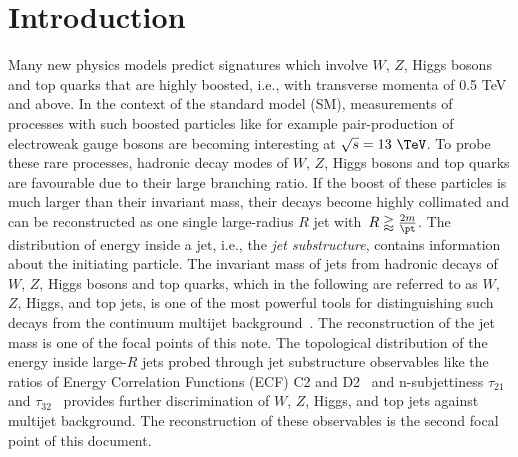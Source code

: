 \documentclass[UKenglish,texlive=2013]{\ATLASLATEXPATH atlasdoc}
\begin{document}
\maketitle

\tableofcontents

\newpage

\section{Introduction}
\label{sec:intro}



Many new physics models predict signatures which involve $W$, $Z$, Higgs bosons and top quarks that are highly boosted, i.e., with transverse momenta \pt of 0.5 TeV and above. In the context of the standard model (SM), measurements of processes with such boosted particles like for example pair-production of electroweak gauge bosons are becoming interesting at $\sqrt s =13~\TeV$. To probe these rare processes, hadronic decay modes of $W$, $Z$, Higgs bosons and top quarks are favourable due to their large branching ratio. If the boost of these particles is much larger than their invariant mass, their decays become highly collimated and can be reconstructed as one single large-radius $R$ jet with~$R\gtrapprox\frac{2m}{\pt}$. The distribution of energy inside a jet, i.e., the {\em jet substructure}, contains information about the initiating particle. The invariant mass of jets from hadronic decays of $W$, $Z$, Higgs bosons and top quarks, which in the following are referred to as $W$, $Z$, Higgs, and top jets, is one of the most powerful tools for distinguishing such decays from the continuum multijet background~\cite{art35}. The reconstruction of the jet mass is one of the focal points of this note. The topological distribution of the energy inside large-$R$ jets probed through jet substructure observables like the ratios of Energy Correlation Functions (ECF) C2 and D2~\cite{bib:ECF} and n-subjettiness $\tau_{21}$ and $\tau_{32}$~\cite{bib:nsub} provides further discrimination of $W$, $Z$, Higgs, and top jets against  multijet background. The reconstruction of these observables is the second focal point of this document.
\end{document}
